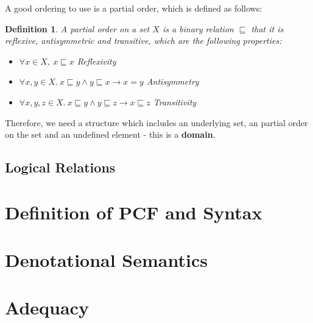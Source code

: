 \documentclass{bhamthesis}
\newtheorem{defn}{Definition}
\begin{document}
A good ordering to use is a partial order, which is defined as follows:

\vspace{0.25cm}

\begin{defn}
A partial order on a set $X$ is a binary relation $\sqsubseteq$  that it is reflexive, antisymmetric and transitive, which are the following properties:
\begin{itemize}
      \item{$\forall x \in X, \ x \sqsubseteq x$ \hspace{4.5cm} Reflexivity}
      \item{$\forall x, y \in X. \  x \sqsubseteq y \wedge y \sqsubseteq x \to x = y$ \hspace{1cm} Antisymmetry}
      \item{$\forall x, y, z \in X. \ x \sqsubseteq y \wedge y \sqsubseteq z \to x \sqsubseteq z$ \hspace{1cm} Transitivity}
\end{itemize} 
\end{defn}


Therefore, we need a structure which includes an underlying set, an partial order on the set and an undefined element - this is a \textbf{domain}.
 



\section{Logical Relations}\label{log}



\chapter{Definition of PCF and Syntax}\label{ch3}




\chapter{Denotational Semantics}\label{ch6}


\chapter{Adequacy}\label{Adequacy}

%
\end{document}
